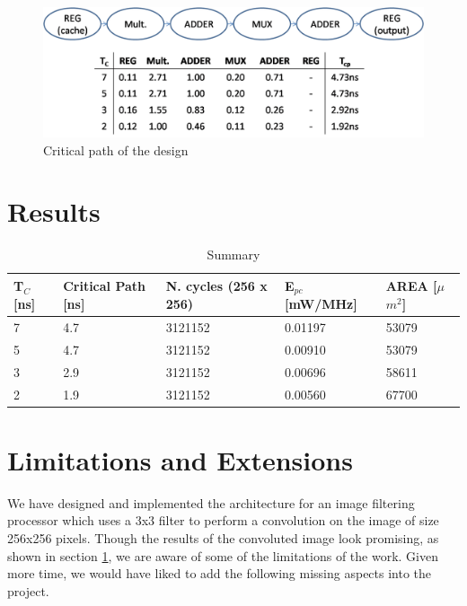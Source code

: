 \documentclass[11pt,a4paper]{article}
\begin{document}
\begin{figure}[h]
	\centering
		\includegraphics[width=6in]{./images/criticalpath.PNG}
	\caption{Critical path of the design}	\label{fig:critical}
\end{figure}

\FloatBarrier
\section{Results}
\label{sec:results}

\begin{table}[h]
	\caption{Summary}
	\begin{center}
		\begin{tabular}{|p{1cm}|p{2cm}|p{2cm}|l|l|} \hline
			\textbf{T}$_C$ [ns] & \textbf{Critical Path} [ns] & \textbf{N. cycles} (256 x 256) & \textbf{E}$_{pc}$ [mW/MHz] & \textbf{AREA} [$\mu$$m^2$] \\ \hline
			7 & 4.7 & 3121152 & 0.01197 & 53079 \\ \hline
			5 & 4.7 & 3121152 & 0.00910 & 53079 \\ \hline
			3 & 2.9 & 3121152 & 0.00696 & 58611 \\ \hline
			2 & 1.9 & 3121152 & 0.00560 & 67700 \\ \hline
		
		\end{tabular}
	\end{center}
	\label{tab:conclusion}
\end{table}


\section{Limitations and Extensions}
\label{sec:limitations}

We have designed and implemented the architecture for an image filtering processor which uses a 3x3 filter to perform a convolution on the image of size 256x256 pixels. Though the results of the convoluted image look promising, as shown in section \ref{sec:results}, we are aware of some of the limitations of the work. Given more time, we would have liked to add the following missing aspects into the project.
\end{document}

